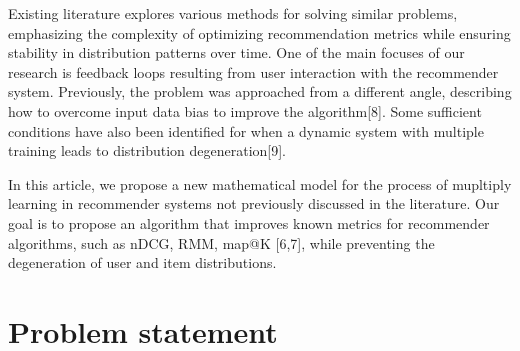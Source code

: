 \documentclass{article}
\begin{document}
Existing literature explores various methods for solving similar problems, emphasizing the complexity of optimizing recommendation metrics while ensuring stability in distribution patterns over time. One of the main focuses of our research is feedback loops resulting from user interaction with the recommender system. Previously, the problem was approached from a different angle, describing how to overcome input data bias to improve the algorithm[8]. Some sufficient conditions have also been identified for when a dynamic system with multiple training leads to distribution degeneration[9].

In this article, we propose a new mathematical model for the process of mupltiply learning in recommender systems not previously discussed in the literature. Our goal is to propose an algorithm that improves known metrics for recommender algorithms, such as nDCG, RMM, map@K [6,7], while preventing the degeneration of user and item distributions.

\section{Problem statement}
\end{document}
